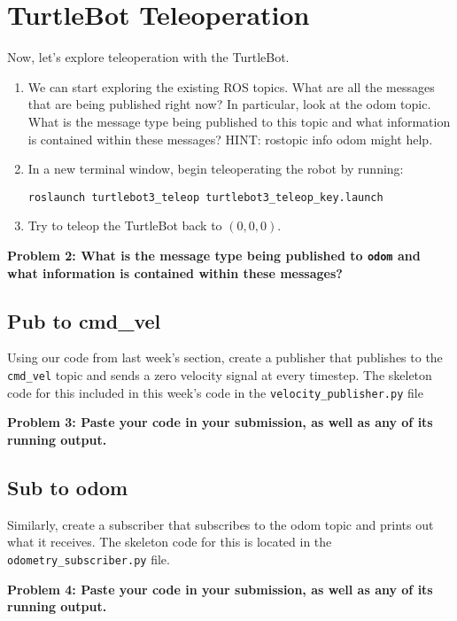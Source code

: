 \section{TurtleBot Teleoperation}

Now, let's explore teleoperation with the TurtleBot.

\begin{enumerate}
\item We can start exploring the existing ROS topics. What are all the messages that are being published right now? In particular, look at the odom topic. What is the message type being published to this topic and what information is contained within these messages? HINT: rostopic info odom might help.
\item In a new terminal window, begin teleoperating the robot by running:
\begin{lstlisting}
roslaunch turtlebot3_teleop turtlebot3_teleop_key.launch
\end{lstlisting}
\item Try to teleop the TurtleBot back to $(0,0,0)$.
\end{enumerate}

{\bf Problem 2: What is the message type being published to \texttt{odom} and what information is contained within these messages?}

\subsection{Pub to cmd\_vel}
Using our code from last week's section, create a publisher that publishes to the \texttt{cmd\_vel} topic and sends a zero velocity signal at every timestep. The skeleton code for this included in this week's code in the \texttt{velocity\_publisher.py} file

{\bf Problem 3: Paste your code in your submission, as well as any of its running output.}

\subsection{Sub to odom}
Similarly, create a subscriber that subscribes to the odom topic and prints out what it receives. The skeleton code for this is located in the \texttt{odometry\_subscriber.py} file.

{\bf Problem 4: Paste your code in your submission, as well as any of its running output.}